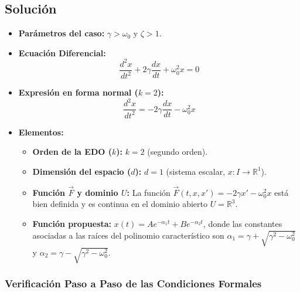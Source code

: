 \begin{enumerate}[label=\arabic*., leftmargin=*]
\begin{enumerate}[label=(\alph*), leftmargin=*]
        \subsection{Solución}
        \begin{itemize}[leftmargin=*]
            \item \textbf{Parámetros del caso:} $\gamma > \omega_0$ y $\zeta > 1$.
            
            \item \textbf{Ecuación Diferencial:}
            \[ \frac{d^2x}{dt^2} + 2\gamma\frac{dx}{dt} + \omega_0^2 x = 0 \]
            
            \item \textbf{Expresión en forma normal ($k = 2$):}
            \[ \frac{d^2x}{dt^2} = -2\gamma\frac{dx}{dt} - \omega_0^2 x \]
            
            \item \textbf{Elementos:}
            \begin{itemize}[leftmargin=*]
                \item \textbf{Orden de la EDO ($k$):} $k = 2$ (segundo orden).
                \item \textbf{Dimensión del espacio ($d$):} $d = 1$ (sistema escalar, $x: I \to \mathbb{R}^1$).
                \item \textbf{Función $\vec{F}$ y dominio $U$:} La función $\vec{F}(t, x, x') = -2\gamma x' - \omega_0^2 x$ está bien definida y es continua en el dominio abierto $U = \mathbb{R}^3$.
                \item \textbf{Función propuesta:} $x(t) = A e^{-\alpha_1 t} + B e^{-\alpha_2 t}$, donde las constantes asociadas a las raíces del polinomio característico son $\alpha_1 = \gamma + \sqrt{\gamma^2 - \omega_0^2}$ y $\alpha_2 = \gamma - \sqrt{\gamma^2 - \omega_0^2}$.
            \end{itemize}
        \end{itemize}

        \subsubsection*{Verificación Paso a Paso de las Condiciones Formales}


\end{enumerate}
\end{enumerate}

